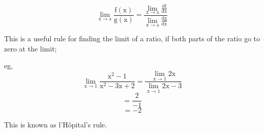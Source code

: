\[ \lim_{ \mathrm{x} \to \mathrm{a}} \frac {\mathrm{f(x)}}{\mathrm{g(x)}} = 
\frac{\displaystyle{\lim_{\mathrm{x} \to \mathrm{a}}}\frac{\mathrm{df}}{\mathrm{dx}}}
{\displaystyle{\lim_{\mathrm{x} \to \mathrm{a}}}\frac{\mathrm{dg}}{\mathrm{dx}}} \]
\par
This is a useful rule for finding the limit of a ratio, if both
parts of the ratio go to zero at the limit;
\par
eg, \[ \lim_{\mathrm{x} \to 1} \frac {\mathrm{x}^2 - 1}{\mathrm{x}^2 - 3 \mathrm{x} + 2} = 
\frac{\displaystyle{\lim_{\mathrm{x} \to 1}}2 \mathrm{x}}
{\displaystyle{\lim_{\mathrm{x} \to 1}}2 \mathrm{x} - 3} \]
\[ = \frac{2}{-1} \]
\[ = -2 \]
\par
This is known as l'H\^opital's rule.